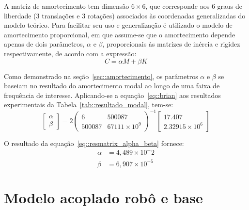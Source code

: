 A matriz de amortecimento tem dimensão $6 \times 6$, que corresponde aos 6 graus
de liberdade (3 translações e 3 rotações) associados às coordenadas
generalizadas do modelo teórico. Para facilitar seu uso e generalização é
utilizado o modelo de amortecimento proporcional, em que assume-se
que o amortecimento depende apenas de dois parâmetros, $\alpha$
e $\beta$, proporcionais às matrizes de inércia e rigidez respectivamente, de
acordo com a expressão:
%
\begin{equation*}
	C = \alpha  M + \beta  K
\end{equation*}
%

Como demonstrado na seção~\ref{sec::amortecimento}, os parâmetros $\alpha$
e $\beta$ se baseiam no resultado do amortecimento modal ao longo de uma
faixa de frequência de interesse. Aplicando-se a equação~\ref{eq::brian} aos
resultados experimentais da Tabela~\ref{tab::resultado_modal}, tem-se:
%
\begin{equation} \label{eq::resmatrix_alpha_beta}
\begin{bmatrix}
	\alpha \\
	\beta
\end{bmatrix}
= 2
\begin{pmatrix}
	6 & 500087 \\ 
	500087 & 67111 \times 10^9
\end{pmatrix}^{-1}
\begin{bmatrix}
	17.407 \\ 
	2.32915 \times 10^6
\end{bmatrix}
\end{equation}

O resultado da equação~\ref{eq::resmatrix_alpha_beta} fornece:
%
\begin{align}
	\alpha &= 4,489 \times 10^-2 \\
	\beta &= 6,907 \times 10^{-5}
\end{align}
%




\section{Modelo acoplado robô e base} \label{sec::acoplado}

